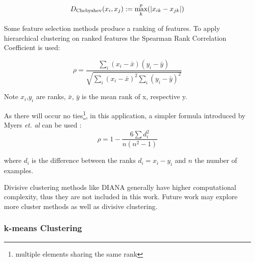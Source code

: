 						\begin{equation}
							D_{\rm Chebyshev}(x_i,x_j) := \max_k^p(|x_{ik} - x_{jk}|)
						\end{equation}

%
%
%

						Some feature selection methods produce a ranking of features. To apply hierarchical clustering on ranked features the Spearman Rank Correlation Coefficient \cite{Myers03} is used:

						\begin{equation}
							\rho = \frac{\sum_i(x_i-\bar{x})(y_i-\bar{y})}{\sqrt{\sum_i (x_i-\bar{x})^2 \sum_i(y_i-\bar{y})^2}}
						\end{equation}

						Note $x_i$,$y_i$ are ranks, $\bar{x}$, $\bar{y}$ is the mean rank of x, respective y.
											
						As there will occur no ties\footnote{multiple elements sharing the same rank}, in this application, a simpler formula introduced by Myers \textit{et. al} can be used \cite{Myers03}:
						\begin{equation}
							\rho = 1- {\frac {6 \sum d_i^2}{n(n^2 - 1)}}
						\end{equation}
	
						where $ d_i $ is the difference between the ranks $ d_i = x_i - y_i $ and $ n $ the number of examples.

						Divisive clustering methods like DIANA \cite{Kaufman90} generally have higher computational complexity, thus they are not included in this work. Future work may explore more cluster methods as well as divisive clustering.

					\subsubsection{k-means Clustering}
					\label{subsubsec:kmeans}


